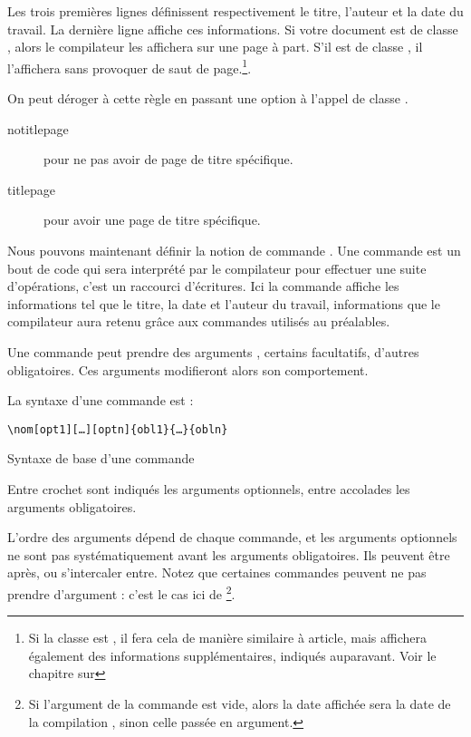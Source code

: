 Les trois premières lignes définissent respectivement le titre, l'auteur et la date du travail.  
La dernière ligne affiche ces informations. Si votre document est de classe  , alors le compilateur les affichera sur une page à part. S'il est de classe  , il l'affichera sans provoquer de saut de page.\footnote{Si la classe  est , il fera cela de manière similaire à article, mais affichera également des informations supplémentaires, indiqués auparavant. Voir le chapitre sur }.

On peut déroger à cette règle en passant une option à l'appel de classe .
\begin{description}
\item[notitlepage] pour ne pas avoir de page de titre spécifique.
\item[titlepage] pour avoir une page de titre spécifique.
\end{description}

Nous pouvons maintenant définir la notion de commande . Une commande  est un bout de code qui sera interprété par le compilateur pour effectuer une suite d'opérations, c'est un raccourci d'écritures. 
Ici la commande  affiche les informations tel que le titre, la date et l'auteur du travail, informations que le compilateur aura retenu grâce aux commandes utilisés au préalables.

Une commande peut prendre des arguments , certains facultatifs, d'autres obligatoires. Ces arguments  modifieront alors son comportement.

La syntaxe d'une commande est :


\begin{listing}[ht]

\begin{verbatim}
\nom[opt1][…][optn]{obl1}{…}{obln}
\end{verbatim}
\caption{Syntaxe de base d'une commande}
\end{listing}

Entre crochet sont indiqués les arguments optionnels, entre accolades les arguments obligatoires.


L'ordre des arguments dépend de chaque commande, et les arguments optionnels ne sont pas systématiquement avant les arguments obligatoires. Ils peuvent être après, ou s'intercaler entre. Notez que certaines commandes peuvent ne pas prendre d'argument : c'est le cas ici de \footnote{Si l'argument de la commande   est vide, alors la date affichée  sera la date de la compilation , sinon celle passée en argument.}.

